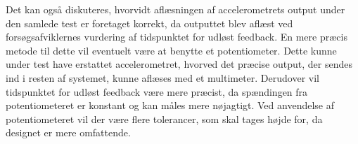 Det kan også diskuteres, hvorvidt aflæsningen af accelerometrets output under den samlede test er foretaget korrekt, da outputtet blev aflæst ved forsøgsafviklernes vurdering af tidspunktet for udløst feedback. En mere præcis metode til dette vil eventuelt være at benytte et potentiometer. Dette kunne under test have erstattet accelerometret, hvorved det præcise output, der sendes ind i resten af systemet, kunne aflæses med et multimeter. Derudover vil tidspunktet for udløst feedback være mere præcist, da spændingen fra potentiometeret er konstant og kan måles mere nøjagtigt. Ved anvendelse af potentiometeret vil der være flere tolerancer, som skal tages højde for, da designet er mere omfattende. \\
\clearpage